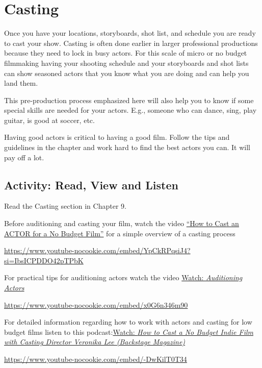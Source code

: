 \documentclass[
  letterpaper,
  DIV=11,
  numbers=noendperiod]{scrreprt}
\begin{document}
\section{Casting}\label{casting}

Once you have your locations, storyboards, shot list, and schedule you
are ready to cast your show. Casting is often done earlier in larger
professional productions because they need to lock in busy actors. For
this scale of micro or no budget filmmaking having your shooting
schedule and your storyboards and shot lists can show seasoned actors
that you know what you are doing and can help you land them.

This pre-production process emphasized here will also help you to know
if some special skills are needed for your actors. E.g., someone who can
dance, sing, play guitar, is good at soccer, etc.

Having good actors is critical to having a good film. Follow the tips
and guidelines in the chapter and work hard to find the best actors you
can. It will pay off a lot.

\subsection*{Activity: Read, View and
Listen}\label{activity-read-view-and-listen}

\begin{tcolorbox}[enhanced jigsaw, titlerule=0mm, opacitybacktitle=0.6, left=2mm, title={Learning Activity}, coltitle=black, colbacktitle=quarto-callout-note-color!10!white, toptitle=1mm, bottomtitle=1mm, colframe=quarto-callout-note-color-frame, colback=white, arc=.35mm, rightrule=.15mm, bottomrule=.15mm, toprule=.15mm, opacityback=0, breakable, leftrule=.75mm]

Read the Casting section in Chapter 9.

Before auditioning and casting your film, watch the video
\href{https://www.youtube.com/watch?v=YpCkRPqsiJ4}{``How to Cast an
ACTOR for a No Budget Film''} for a simple overview of a casting process

\url{https://www.youtube-nocookie.com/embed/YpCkRPqsiJ4?si=IbsICPDDO42pTPbK}

For practical tips for auditioning actors watch the video
\href{https://www.youtube.com/watch?v=x0G6n346m90}{Watch:
\emph{Auditioning Actors}}

\url{https://www.youtube-nocookie.com/embed/x0G6n346m90}

For detailed information regarding how to work with actors and casting
for low budget films listen to this
podcast:\href{https://www.youtube.com/watch?v=-DwKilT0T34}{Watch:
\emph{How to Cast a No Budget Indie Film with Casting Director Veronika
Lee (Backstage Magazine)}}

\url{https://www.youtube-nocookie.com/embed/-DwKilT0T34}

\end{tcolorbox}
\end{document}
